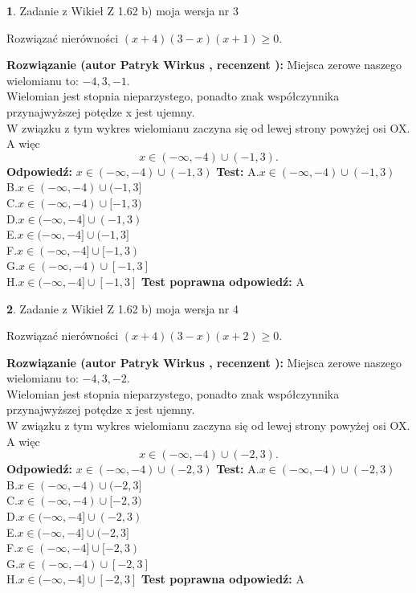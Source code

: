\documentclass[12pt, a4paper]{article}
\theoremstyle{definition} %
\newtheorem{zad}{}
\newcommand{\zadStart}[1]{\begin{zad}#1\newline}
\newcommand{\zadStop}{\end{zad}}
\newcommand{\rozwStart}[2]{\noindent \textbf{Rozwiązanie (autor #1 , recenzent #2): }\newline}
\newcommand{\rozwStop}{\newline}
\newcommand{\odpStart}{\noindent \textbf{Odpowiedź:}\newline}
\newcommand{\odpStop}{\newline}
\newcommand{\testStart}{\noindent \textbf{Test:}\newline}
\newcommand{\testStop}{\newline}
\newcommand{\kluczStart}{\noindent \textbf{Test poprawna odpowiedź:}\newline}
\newcommand{\kluczStop}{\newline}
\begin{document}
\zadStart{Zadanie z Wikieł Z 1.62 b) moja wersja nr 3}

Rozwiązać nierówności $(x+4)(3-x)(x+1)\ge0$.
\zadStop
\rozwStart{Patryk Wirkus}{}
Miejsca zerowe naszego wielomianu to: $-4, 3, -1$.\\
Wielomian jest stopnia nieparzystego, ponadto znak współczynnika przy\linebreak najwyższej potędze x jest ujemny.\\ W związku z tym wykres wielomianu zaczyna się od lewej strony powyżej osi OX. A więc $$x \in (-\infty,-4) \cup (-1,3).$$
\rozwStop
\odpStart
$x \in (-\infty,-4) \cup (-1,3)$
\odpStop
\testStart
A.$x \in (-\infty,-4) \cup (-1,3)$\\
B.$x \in (-\infty,-4) \cup (-1,3]$\\
C.$x \in (-\infty,-4) \cup [-1,3)$\\
D.$x \in (-\infty,-4] \cup (-1,3)$\\
E.$x \in (-\infty,-4] \cup (-1,3]$\\
F.$x \in (-\infty,-4] \cup [-1,3)$\\
G.$x \in (-\infty,-4) \cup [-1,3]$\\
H.$x \in (-\infty,-4] \cup [-1,3]$
\testStop
\kluczStart
A
\kluczStop



\zadStart{Zadanie z Wikieł Z 1.62 b) moja wersja nr 4}

Rozwiązać nierówności $(x+4)(3-x)(x+2)\ge0$.
\zadStop
\rozwStart{Patryk Wirkus}{}
Miejsca zerowe naszego wielomianu to: $-4, 3, -2$.\\
Wielomian jest stopnia nieparzystego, ponadto znak współczynnika przy\linebreak najwyższej potędze x jest ujemny.\\ W związku z tym wykres wielomianu zaczyna się od lewej strony powyżej osi OX. A więc $$x \in (-\infty,-4) \cup (-2,3).$$
\rozwStop
\odpStart
$x \in (-\infty,-4) \cup (-2,3)$
\odpStop
\testStart
A.$x \in (-\infty,-4) \cup (-2,3)$\\
B.$x \in (-\infty,-4) \cup (-2,3]$\\
C.$x \in (-\infty,-4) \cup [-2,3)$\\
D.$x \in (-\infty,-4] \cup (-2,3)$\\
E.$x \in (-\infty,-4] \cup (-2,3]$\\
F.$x \in (-\infty,-4] \cup [-2,3)$\\
G.$x \in (-\infty,-4) \cup [-2,3]$\\
H.$x \in (-\infty,-4] \cup [-2,3]$
\testStop
\kluczStart
A
\kluczStop
\end{document}
